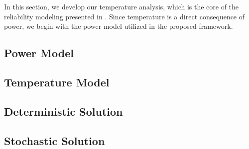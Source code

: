 In this section, we develop our temperature analysis, which is the core of the reliability modeling presented in .
Since temperature is a direct consequence of power, we begin with the power model utilized in the proposed framework.

\subsection{Power Model} 


\subsection{Temperature Model} 


\subsection{Deterministic Solution} 


\subsection{Stochastic Solution} 


